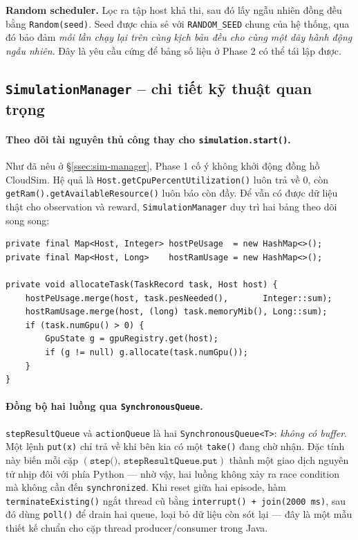 \textbf{Random scheduler.} Lọc ra tập host khả thi, sau đó lấy ngẫu
nhiên đồng đều bằng \texttt{Random(seed)}. Seed được chia sẻ với
\texttt{RANDOM\_SEED} chung của hệ thống, qua đó bảo đảm \emph{mỗi lần
chạy lại trên cùng kịch bản đều cho cùng một dãy hành động ngẫu nhiên}.
Đây là yêu cầu cứng để bảng số liệu ở Phase 2 có thể tái lập được.

\subsection{\texttt{SimulationManager} -- chi tiết kỹ thuật quan trọng}
\label{ssec:impl-sim-manager}

\paragraph{Theo dõi tài nguyên thủ công thay cho \texttt{simulation.start()}.}
Như đã nêu ở §\ref{ssec:sim-manager}, Phase 1 cố ý không khởi động
đồng hồ CloudSim. Hệ quả là
\texttt{Host.getCpuPercentUtilization()} luôn trả về $0$, còn
\texttt{getRam().getAvailableResource()} luôn báo còn đầy. Để vẫn có
được dữ liệu thật cho observation và reward, \texttt{SimulationManager}
duy trì hai bảng theo dõi song song:

\begin{lstlisting}[style=javastyle, caption={Manual resource accounting.
Đây là \emph{nguồn sự thật} duy nhất cho utilisation trong Phase 1.},
label={lst:manual-tracking}]
private final Map<Host, Integer> hostPeUsage  = new HashMap<>();
private final Map<Host, Long>    hostRamUsage = new HashMap<>();

private void allocateTask(TaskRecord task, Host host) {
    hostPeUsage.merge(host, task.pesNeeded(),       Integer::sum);
    hostRamUsage.merge(host, (long) task.memoryMib(), Long::sum);
    if (task.numGpu() > 0) {
        GpuState g = gpuRegistry.get(host);
        if (g != null) g.allocate(task.numGpu());
    }
}
\end{lstlisting}


\paragraph{Đồng bộ hai luồng qua \texttt{SynchronousQueue}.}
\texttt{stepResultQueue} và \texttt{actionQueue} là hai
\texttt{SynchronousQueue<T>}: \emph{không có buffer}. Một lệnh
\texttt{put(x)} chỉ trả về khi bên kia có một \texttt{take()} đang
chờ nhận. Đặc tính này biến mỗi cặp
$(\texttt{step()},\,\texttt{stepResultQueue.put})$ thành một giao
dịch nguyên tử nhịp đôi với phía Python --- nhờ vậy, hai luồng không
xảy ra race condition mà không cần đến \texttt{synchronized}. Khi
reset giữa hai episode, hàm \texttt{terminateExisting()} ngắt thread
cũ bằng \texttt{interrupt() + join(2000\,ms)}, sau đó dùng
\texttt{poll()} để drain hai queue, loại bỏ dữ liệu còn sót lại ---
đây là một mẫu thiết kế chuẩn cho cặp thread producer/consumer trong
Java.

